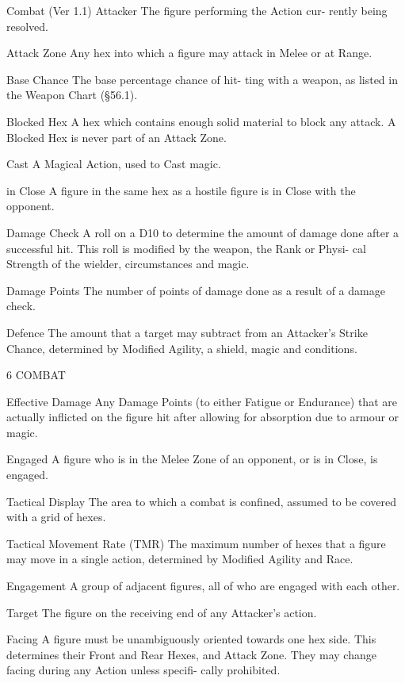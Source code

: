 \begin{Chapter}{Combat (Ver 1.1)}
Attacker  The  figure  performing  the  Action  cur-
rently being resolved. 

Attack  Zone  Any  hex  into  which  a  figure  may 
attack in Melee or at Range. 

Base  Chance  The  base  percentage  chance  of  hit-
ting with a weapon, as listed in the Weapon Chart 
(§56.1). 

Blocked  Hex  A  hex  which  contains  enough  solid 
material  to  block  any  attack.  A  Blocked  Hex  is 
never part of an Attack Zone. 

Cast A Magical Action, used to Cast magic. 

in  Close  A  figure  in  the  same  hex  as  a  hostile 
figure is in Close with the opponent. 

Damage  Check  A  roll  on  a  D10  to  determine  the 
amount of damage done after a successful hit. This 
roll is modified by the weapon, the Rank or Physi-
cal  Strength  of  the  wielder,  circumstances  and 
magic. 

Damage  Points  The  number  of  points  of  damage 
done as a result of a damage check. 

Defence  The  amount  that  a  target  may  subtract 
from  an  Attacker’s  Strike  Chance,  determined  by 
Modified Agility, a shield, magic and conditions. 

6 COMBAT 

Effective  Damage  Any  Damage  Points  (to  either 
Fatigue or Endurance) that are actually inflicted on 
the  figure  hit  after  allowing  for  absorption  due  to 
armour or magic. 

Engaged A figure who is in the Melee Zone of an 
opponent, or is in Close, is engaged. 

Tactical  Display  The  area  to  which  a  combat  is 
confined,  assumed  to  be  covered  with  a  grid  of 
hexes. 

Tactical  Movement  Rate  (TMR)  The  maximum 
number of hexes that a figure may move in a single 
action, determined by Modified Agility and Race. 

Engagement  A  group  of  adjacent  figures,  all  of 
who are engaged with each other. 

Target  The  figure  on  the  receiving  end  of  any 
Attacker’s action. 

Facing  A  figure  must  be  unambiguously  oriented 
towards  one  hex  side.  This  determines  their  Front 
and  Rear  Hexes,  and  Attack  Zone.  They  may 
change  facing  during  any  Action  unless  specifi-
cally prohibited. 


\end{Chapter}
